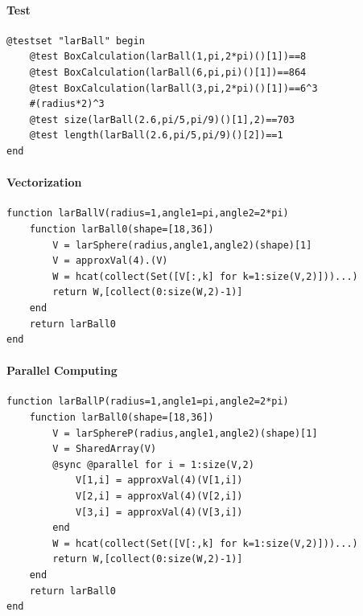 \documentclass{article}
\begin{document}
\paragraph{Test}
\begin{Verbatim}
@testset "larBall" begin
	@test BoxCalculation(larBall(1,pi,2*pi)()[1])==8
	@test BoxCalculation(larBall(6,pi,pi)()[1])==864
	@test BoxCalculation(larBall(3,pi,2*pi)()[1])==6^3
	#(radius*2)^3
	@test size(larBall(2.6,pi/5,pi/9)()[1],2)==703
	@test length(larBall(2.6,pi/5,pi/9)()[2])==1
end
\end{Verbatim}

\paragraph{Vectorization\\}

\begin{Verbatim}
function larBallV(radius=1,angle1=pi,angle2=2*pi)
    function larBall0(shape=[18,36])
        V = larSphere(radius,angle1,angle2)(shape)[1]
        V = approxVal(4).(V)
        W = hcat(collect(Set([V[:,k] for k=1:size(V,2)]))...)
        return W,[collect(0:size(W,2)-1)]
    end
    return larBall0
end
\end{Verbatim}

\paragraph{Parallel Computing\\}

\begin{Verbatim}
function larBallP(radius=1,angle1=pi,angle2=2*pi)
    function larBall0(shape=[18,36])
        V = larSphereP(radius,angle1,angle2)(shape)[1]
        V = SharedArray(V)
        @sync @parallel for i = 1:size(V,2)
            V[1,i] = approxVal(4)(V[1,i])
            V[2,i] = approxVal(4)(V[2,i])
            V[3,i] = approxVal(4)(V[3,i])
        end
        W = hcat(collect(Set([V[:,k] for k=1:size(V,2)]))...)
        return W,[collect(0:size(W,2)-1)]
    end
    return larBall0
end
\end{Verbatim}
\end{document}
